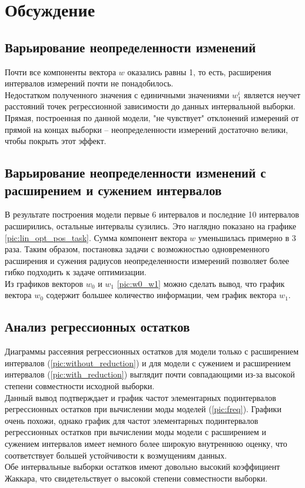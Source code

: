 \section{Обсуждение}

\subsection{Варьирование неопределенности изменений}

Почти все компоненты вектора $w$ оказались равны 1, то есть, расширения интервалов измерений почти не понадобилось. \\
Недостатком полученного значения с единичными значениями $w_{1}^i$ является неучет расстояний точек регрессионной зависимости до данных интервальной выборки. Прямая, построенная по данной модели, "не чувствует" отклонений измерений от прямой на концах выборки -- неопределенности измерений достаточно велики, чтобы покрыть этот эффект.

\subsection{Варьирование неопределенности изменений с расширением и сужением интервалов}

В результате построения модели первые 6 интервалов и последние 10 интервалов расширились, остальные интервалы сузились. Это наглядно показано на графике \ref{pic:lin_opt_pos_task}. Сумма компонент вектора $w$ уменьшилась примерно в 3 раза. Таким образом, постановка задачи с возможностью одновременного расширения и сужения радиусов неопределенности измерений позволяет более гибко подходить к задаче оптимизации. \\
Из графиков векторов $w_0$ и $w_1$ \ref{pic:w0_w1} можно сделать вывод, что график вектора $w_0$ содержит большее количество информации, чем график вектора $w_1$.\\

\subsection{Анализ регрессионных остатков}

Диаграммы рассеяния регрессионных остатков для модели только с расширением интервалов (\ref{pic:without_reduction}) и для модели с сужением и расширением интервалов (\ref{pic:with_reduction}) выглядит почти совпадающими из-за высокой степени совместности исходной выборки. \\
Данный вывод подтверждает и график частот элементарных подинтервалов регрессионных остатков при вычислении моды моделей (\ref{pic:freq}). Графики очень похожи, однако график для частот элементарных подинтервалов регрессионных остатков при вычислении моды модели с расширением и сужением интервалов имеет немного более широкую внутреннюю оценку, что соответствует большей устойчивости к возмущениям данных.\\
Обе интервальные выборки остатков имеют довольно высокий коэффициент Жаккара, что свидетельствует о высокой степени совместности выборки. 

